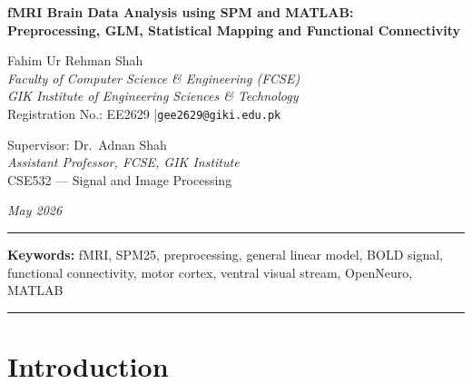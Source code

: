 \documentclass[12pt,a4paper]{article}
\begin{document}
\begin{center}
  {\LARGE\bfseries fMRI Brain Data Analysis using SPM and MATLAB:\\[0.3em]
  Preprocessing, GLM, Statistical Mapping and Functional Connectivity}

  \vspace{1em}

  {\large Fahim Ur Rehman Shah}\\[0.2em]
  \textit{Faculty of Computer Science \& Engineering (FCSE)}\\
  \textit{GIK Institute of Engineering Sciences \& Technology}\\
  Registration No.: EE2629 \quad|\quad \texttt{gee2629@giki.edu.pk}

  \vspace{0.5em}

  {\large Supervisor: Dr.\ Adnan Shah}\\[0.2em]
  \textit{Assistant Professor, FCSE, GIK Institute}\\
  CSE532 --- Signal and Image Processing

  \vspace{0.5em}
  \textit{May 2026}
\end{center}

\vspace{0.5em}
\hrule
\vspace{1em}

\begin{abstract}

\end{abstract}

\noindent\textbf{Keywords:} fMRI, SPM25, preprocessing, general linear model,
BOLD signal, functional connectivity, motor cortex, ventral visual stream,
OpenNeuro, MATLAB

\vspace{1em}
\hrule
\vspace{1em}

\section{Introduction}

\end{document}
